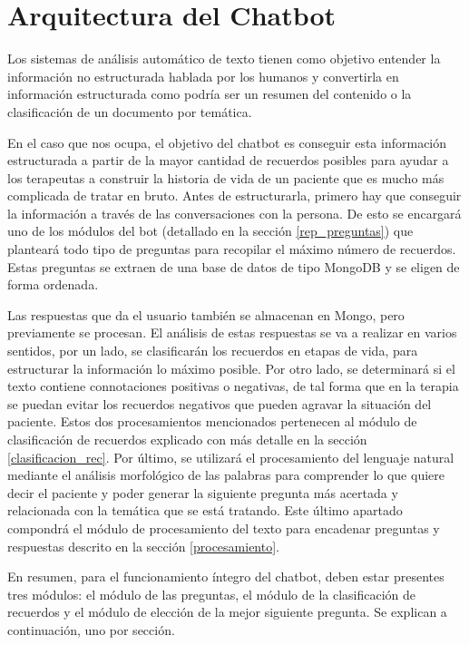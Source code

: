 \chapter{Arquitectura del Chatbot}
\label{cap:arquitectura}

Los sistemas de análisis automático de texto tienen como objetivo entender la información no estructurada hablada por los humanos y convertirla en información estructurada como podría ser un resumen del contenido o la clasificación de un documento por temática.

En el caso que nos ocupa, el objetivo del chatbot es conseguir esta información estructurada a partir de la mayor cantidad de recuerdos posibles para ayudar a los terapeutas a construir la historia de vida de un paciente que es mucho más complicada de tratar en bruto. Antes de estructurarla, primero hay que conseguir la información a través de las conversaciones con la persona. De esto se encargará uno de los módulos del bot (detallado en la sección \ref{rep_preguntas}) que planteará todo tipo de preguntas para recopilar el máximo número de recuerdos. Estas preguntas se extraen de una base de datos de tipo MongoDB y se eligen de forma ordenada.

Las respuestas que da el usuario también se almacenan en Mongo, pero previamente se procesan. El análisis de estas respuestas se va a realizar en varios sentidos, por un lado, se clasificarán los recuerdos en etapas de vida, para estructurar la información lo máximo posible. Por otro lado, se determinará si el texto contiene connotaciones positivas o negativas, de tal forma que en la terapia se puedan evitar los recuerdos negativos que pueden agravar la situación del paciente. Estos dos procesamientos mencionados pertenecen al módulo de clasificación de recuerdos explicado con más detalle en la sección \ref{clasificacion_rec}. Por último, se utilizará el procesamiento del lenguaje natural mediante el análisis morfológico de las palabras para comprender lo que quiere decir el paciente y poder generar la siguiente pregunta más acertada y relacionada con la temática que se está tratando. Este último apartado compondrá el módulo de procesamiento del texto para encadenar preguntas y respuestas descrito en la sección \ref{procesamiento}.

En resumen, para el funcionamiento íntegro del chatbot, deben estar presentes tres módulos: el módulo de las preguntas, el módulo de la clasificación de recuerdos y el módulo de elección de la mejor siguiente pregunta. Se explican a continuación, uno por sección.

